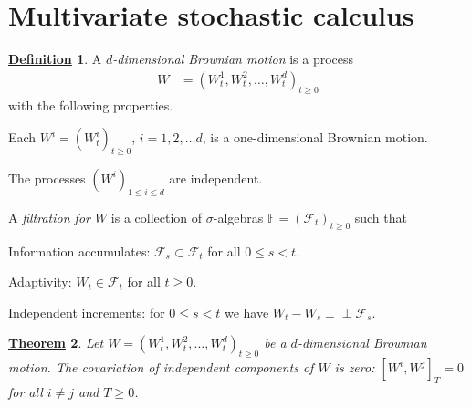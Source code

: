 \documentclass[12pt]{book}
\numberwithin{equation}{chapter}
\theoremstyle{plain}
\newtheorem{theorem}{\underline{Theorem}}
\numberwithin{theorem}{section}
\theoremstyle{definition}
\newtheorem{definition}[theorem]{\underline{Definition}}
\numberwithin{exercise}{chapter}
\newcommand{\<}{\langle}
\renewcommand{\>}{\rangle}
\renewcommand{\(}{\left(}
\renewcommand{\)}{\right)}
\renewcommand{\[}{\left[}
\renewcommand{\]}{\right]}
\newcommand\Fb{\mathds{F}}
\newcommand\Fc{\mathscr{F}}
\newcommand\sig{\sigma}
\newcommand{\ind}{\perp \! \! \! \perp}
\begin{document}

\section{Multivariate stochastic calculus}
\label{sec:multivariate}

\begin{definition}
\label{def:d.bm}
A  \emph{$d$-dimensional Brownian motion} is a process
\begin{align}
W 
	&=	( W_t^1 , W_t^2, \ldots, W_t^d)_{t \geq 0}
\end{align}
with the following properties.
\begin{enumerate*}
\item Each $W^i = (W_t^i)_{t \geq 0}$, $i = 1, 2, \ldots d$, is a one-dimensional Brownian motion.
\item The processes $(W^i)_{1 \leq i \leq d}$ are independent.
\end{enumerate*}
A \emph{filtration for $W$} is a collection of $\sig$-algebras $\Fb=(\Fc_t)_{t \geq 0}$ such that
\begin{enumerate*}
\item Information accumulates: $\Fc_s \subset \Fc_t$ for all $0 \leq s < t$.
\item Adaptivity: $W_t \in \Fc_t$ for all $t \geq 0$.
\item Independent increments: for $0 \leq s < t$ we have $W_t - W_s \ind \Fc_s$.
\end{enumerate*}
\end{definition}

\begin{theorem}
\label{thm:bm.CoV}
Let $W=( W_t^1 , W_t^2, \ldots, W_t^d)_{t \geq 0}$ be a $d$-dimensional Brownian motion.  The covariation of independent components of $W$ is zero: $[W^i,W^j]_T = 0$ for all $i \neq j$ and $T \geq 0$.
\end{theorem}
\end{document}
